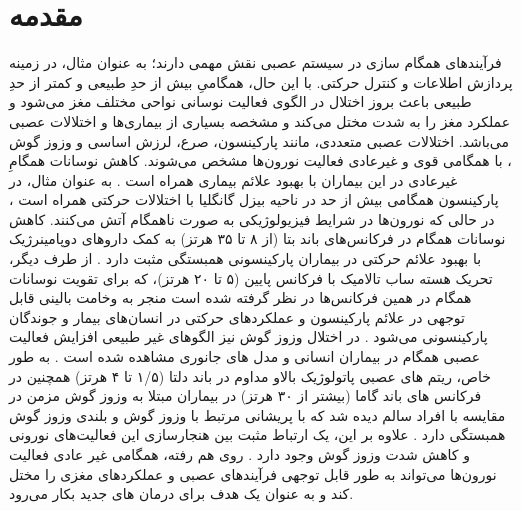 \section{مقدمه}

فرآیندهای همگام سازی در سیستم عصبی نقش مهمی دارند؛ به عنوان مثال، در زمینه پردازش اطلاعات و کنترل حرکتی. 
با این حال، همگامیِ بیش از حدِ طبیعی و کمتر از حدِ طبیعی باعث بروز اختلال در الگوی فعالیت نوسانی نواحی مختلف مغز می‌شود و عملکرد مغز را به شدت مختل می‌کند و مشخصه بسیاری از بیماری‌ها و اختلالات عصبی می‌باشد.
اختلالات عصبی متعددی، مانند پارکینسون، صرع، لرزش اساسی
 و وزوز گوش
  ، با همگامی قوی و غیرعادی فعالیت نورون‌ها مشخص می‌شوند. کاهش نوسانات همگامِ غیرعادی در این بیماران با بهبود علائم بیماری همراه است 
\cite{uhlhaas2006neural}
.
 به عنوان مثال، در پارکینسون همگامی بیش از حد در ناحیه بیزل گانگلیا
  با اختلالات حرکتی همراه است
 \cite{hammond2007pathological}
 ، در حالی که نورون‌ها در شرایط فیزیولوژیکی به صورت ناهمگام آتش می‌کنند.  کاهش نوسانات همگام در فرکانس‌های باند بتا (از ۸ تا ۳۵ هرتز) به کمک داروهای دوپامینرژیک با بهبود علائم حرکتی در بیماران پارکینسونی همبستگی مثبت دارد
  \cite{hammond2007pathological, kuhn2006reduction}.
  از طرف دیگر، تحریک هسته ساب تالامیک
با فرکانس پایین (۵ تا ۲۰ هرتز)، که برای تقویت نوسانات همگام در همین فرکانس‌ها در نظر گرفته شده است منجر به وخامت بالینی قابل توجهی در علائم پارکینسون و عملکردهای حرکتی در انسان‌های بیمار و جوندگان پارکینسونی می‌شود
\cite{jenkinson2011new, moro2002impact, timmermann2004ten, eusebio2008effects, barnikol2008tremor, chen2011stimulation}.
در اختلال وزوز گوش نیز الگوهای غیر طبیعی افزایش فعالیت عصبی همگام در بیماران انسانی و مدل های جانوری مشاهده شده است
\cite{weisz2005tinnitus, weisz2007neural, dohrmann2007tuning, adamchic2014reversing}.
 به طور خاص، ریتم های عصبی پاتولوژیک بالاو مداوم در باند دلتا (۱/۵ تا ۴ هرتز) همچنین در فرکانس های باند گاما (بیشتر از ۳۰ هرتز) در بیماران مبتلا به وزوز گوش مزمن در مقایسه با افراد سالم دیده شد که با پریشانی مرتبط با وزوز گوش و بلندی وزوز گوش همبستگی دارد
 \cite{weisz2005tinnitus, weisz2007neural, lorenz2009loss}.
  علاوه بر این، یک ارتباط مثبت بین هنجارسازی این فعالیت‌های نورونی و کاهش شدت وزوز گوش وجود دارد
\cite{weisz2005tinnitus, weisz2007neural, dohrmann2007tuning, adamchic2014reversing, lorenz2009loss}.  
   روی هم رفته، همگامی غیر عادی فعالیت نورون‌ها می‌تواند به طور قابل توجهی فرآیندهای عصبی و عملکردهای مغزی را مختل کند و به عنوان یک هدف برای درمان های جدید بکار می‌رود.


